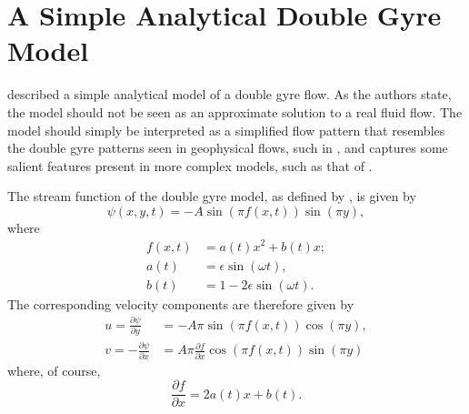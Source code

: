 \documentclass[10pt, twoside]{book}
\begin{document}
		\section{\label{sec:DoubleGyre}A Simple Analytical Double Gyre Model}
			
			\citet{Shadden05} described a simple analytical model of a double gyre flow. As the authors state, the model should not be seen as an approximate solution to a real fluid flow. The model should simply be interpreted as a simplified flow pattern that resembles the double gyre patterns seen in geophysical flows, such in \citet{Coulliette07}, and captures some salient features present in more complex models, such as that of \citet{Coulliette00,Coulliette01}.
			
			The stream function of the double gyre model, as defined by \citet{Shadden05}, is given by
			\begin{equation}
			\label{eq:DoubleGyreStream}
				\psi\left(x,y,t\right) = -A\sin\left({\pi}f\left(x,t\right)\right)\sin\left({\pi}y\right),
			\end{equation}
			where
			\begin{subequations}
			\label{eq:DoubleGyreStreamDefs}
				\begin{align}
					f\left(x,t\right) &= a\left(t\right)x^2 + b\left(t\right)x;\label{eq:DoubleGyreStreamDefs1}\\
					a\left(t\right)   &= \epsilon\sin\left({\omega}t\right),\label{eq:DoubleGyreStreamDefs2}\\
					b\left(t\right)   &= 1 - 2\epsilon\sin\left({\omega}t\right).\label{eq:DoubleGyreStreamDefs3}
				\end{align}
			\end{subequations}
			The corresponding velocity components are therefore given by
			\begin{subequations}
			\label{eq:DoubleGyreVel}
				\begin{align}
					u = \frac{\partial\psi}{\partial y} &= -A\pi\sin\left({\pi}f\left(x,t\right)\right)\cos\left({\pi}y\right),\label{eq:DoubleGyreVelU}\\
					v = -\frac{\partial\psi}{\partial x} &= A\pi\frac{\partial f}{\partial x}\cos\left({\pi}f\left(x,t\right)\right)\sin\left({\pi}y\right)\label{eq:DoubleGyreVelV}
				\end{align}
			\end{subequations}
			where, of course,
			\begin{equation}
			\label{eq:DoubleGyreStreamdfdx}
				\frac{\partial f}{\partial x} = 2a\left(t\right)x + b\left(t\right).
			\end{equation}
\end{document}
